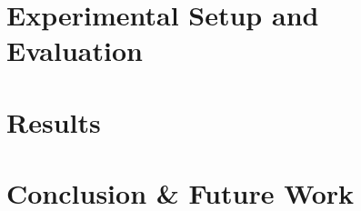 \documentclass{article}
\begin{document}
\section{Experimental Setup and Evaluation}


\section{Results}


\section{Conclusion \& Future Work}



%

%
%


\end{document}
